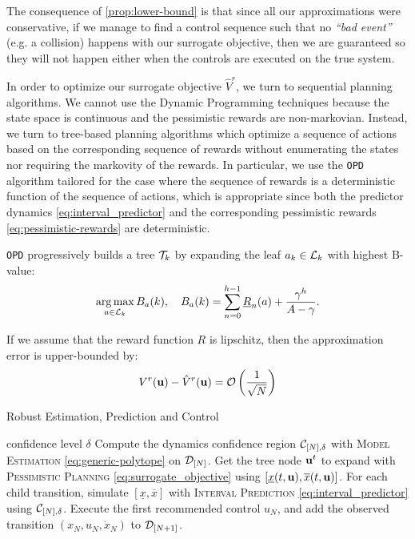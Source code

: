\documentclass{article}
\begin{document}
The consequence of \autoref{prop:lower-bound} is that since all our approximations were conservative, if we manage to find a control sequence such that no \textit{``bad event''} (e.g. a collision) happens with our surrogate objective, then we are guaranteed so they will not happen either when the controls are executed on the true system. 

In order to optimize our surrogate objective $\hat{V}^r$, we turn to sequential planning algorithms. We cannot use the Dynamic Programming techniques because the state space is continuous and the pessimistic rewards are non-markovian. Instead, we turn to tree-based planning algorithms which optimize a sequence of actions based on the corresponding sequence of rewards without enumerating the states nor requiring the markovity of the rewards. In particular, we use the \texttt{OPD} algorithm \citep{Hren2008} tailored for the case where the sequence of rewards is a deterministic function of the sequence of actions, which is appropriate since both the predictor dynamics \eqref{eq:interval_predictor} and the corresponding pessimistic rewards \eqref{eq:pessimistic-rewards} are deterministic.

\texttt{OPD} progressively builds a tree $\mathcal{T}_k$ by expanding the leaf $a_k\in\mathcal{L}_k$ with highest B-value:
\begin{equation}
\operatorname*{arg\,max}_{a\in\mathcal{L}_k} B_a(k), \quad B_a(k) = \sum_{n=0}^{h-1} \underline{R}_n(a) + \frac{\gamma^h}{A-\gamma}.
\end{equation}

\begin{proposition}
\label{prop:control-error}
If we assume that the reward function $R$ is lipschitz, then the approximation error is upper-bounded by:
\begin{equation*}
     V^r(\mathbf{u}) - \hat{V}^r(\mathbf{u}) = \mathcal{O}\left(\frac{1}{\sqrt{N}}\right)
\end{equation*}
\end{proposition}

\begin{algorithm}[tb]
   \caption{Robust Estimation, Prediction and Control}
   \label{alg:full}
\begin{algorithmic}
    confidence level $\delta$
   \STATE Compute the dynamics confidence region $\mathcal{C}_{[N],\delta}$ with \textsc{Model Estimation} \eqref{eq:generic-polytope} on $\mathcal{D}_{[N]}$.
   \STATE Get the tree node $\mathbf{u}^t$ to expand with \textsc{Pessimistic Planning}  \eqref{eq:surrogate_objective} using $[\underline{x}(t,\mathbf{u}), \overline{x}(t,\mathbf{u})]$.
   \STATE For each child transition, simulate $[\underline{x}, \overline{x}]$ with \textsc{Interval Prediction} \eqref{eq:interval_predictor} using $\mathcal{C}_{[N],\delta}$.
   \ENDFOR
   \STATE Execute the first recommended control $u_N$, and add the observed transition $(x_N, u_N, \dot{x}_N)$ to $\mathcal{D}_{[N+1]}$.
   \ENDFOR
   
\end{algorithmic}
\end{algorithm}
\end{document}
